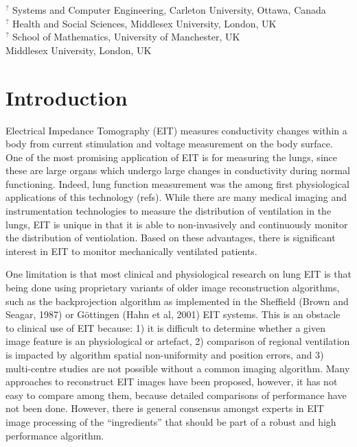 \documentclass[letterpaper,twocolumn,11pt]{article}
\begin{document}
{\small
\noindent $^?$ Systems and Computer Engineering,
               Carleton University, Ottawa, Canada \\
\noindent $^?$ Health and Social Sciences,
               Middlesex University, London, UK \\
\noindent $^?$ School of Mathematics,
               University of Manchester, UK \\
               Middlesex University, London, UK \\
}

\section{Introduction}
Electrical Impedance Tomography (EIT) measures conductivity
changes within a body from current stimulation and voltage
measurement on the body surface. One of the most promising
application of EIT is for measuring the lungs, since these
are large organs which undergo large changes in conductivity
during normal functioning. Indeed, lung function measurement
was the among first physiological applications of this technology
(refs). While there are many medical imaging and instrumentation
technologies to measure the distribution of ventilation
in the lungs, EIT is unique in that it
is able to non-invasively and continuously monitor the distribution of 
ventiolation. Based on these advantages, there is significant
interest in EIT to 
monitor mechanically ventilated patients.

One limitation is that most clinical and physiological research
on lung EIT is that being done using proprietary variants of
older image reconstruction algorithms, such as the backprojection
algorithm as implemented
in the Sheffield (Brown and Seagar, 1987)
or G\"ottingen (Hahn et al, 2001) EIT systems.
This is an obstacle to clinical use of EIT because:
1) it is difficult to determine whether a given image feature is 
an physiological or artefact,
2) comparison of regional ventilation is impacted by
algorithm spatial non-uniformity and position errors,
and 
3) multi-centre studies are not possible without a 
common imaging algorithm.
Many approaches to reconstruct EIT images have been proposed,
however, it has not easy to compare among them, because 
detailed comparisons of performance have not been done. 
However, there is general consensus amongst experts
in EIT image processing of the ``ingredients'' that should
be part of a robust and high performance algorithm.
\end{document}

